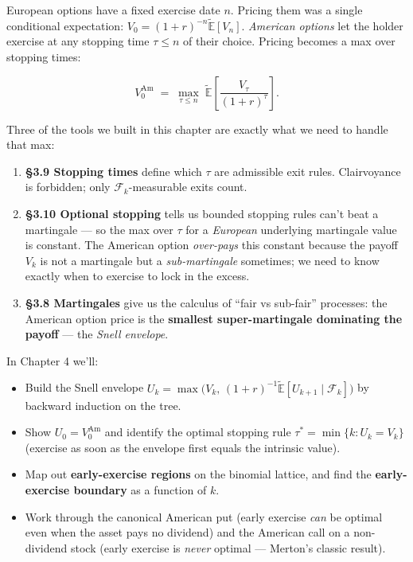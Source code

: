 \documentclass[
  10pt,
  twoside]{book}
\providecommand{\tightlist}{%
  \setlength{\itemsep}{0pt}\setlength{\parskip}{0pt}}
\begin{document}
European options have a fixed exercise date \(n\). Pricing them was a
single conditional expectation:
\(V_0 = (1+r)^{-n}\tilde{\mathbb E}[V_n]\). \emph{American options} let
the holder exercise at any stopping time \(\tau \le n\) of their choice.
Pricing becomes a max over stopping times:

\[V_0^{\mathrm{Am}} \;=\; \max_{\tau \le n}\; \tilde{\mathbb E}\!\left[\frac{V_\tau}{(1+r)^\tau}\right].\]

Three of the tools we built in this chapter are exactly what we need to
handle that max:

\begin{enumerate}
\def\labelenumi{\arabic{enumi}.}
\tightlist
\item
  \textbf{§3.9 Stopping times} define which \(\tau\) are admissible exit
  rules. Clairvoyance is forbidden; only \(\mathcal F_k\)-measurable
  exits count.
\item
  \textbf{§3.10 Optional stopping} tells us bounded stopping rules can't
  beat a martingale --- so the max over \(\tau\) for a \emph{European}
  underlying martingale value is constant. The American option
  \emph{over-pays} this constant because the payoff \(V_k\) is not a
  martingale but a \emph{sub-martingale} sometimes; we need to know
  exactly when to exercise to lock in the excess.
\item
  \textbf{§3.8 Martingales} give us the calculus of ``fair vs sub-fair''
  processes: the American option price is the \textbf{smallest
  super-martingale dominating the payoff} --- the \emph{Snell envelope}.
\end{enumerate}

In Chapter 4 we'll:

\begin{itemize}
\tightlist
\item
  Build the Snell envelope
  \(U_k = \max\!\bigl(V_k,\, (1+r)^{-1}\tilde{\mathbb E}[U_{k+1} \mid \mathcal F_k]\bigr)\)
  by backward induction on the tree.
\item
  Show \(U_0 = V_0^{\mathrm{Am}}\) and identify the optimal stopping
  rule \(\tau^* = \min\{k : U_k = V_k\}\) (exercise as soon as the
  envelope first equals the intrinsic value).
\item
  Map out \textbf{early-exercise regions} on the binomial lattice, and
  find the \textbf{early-exercise boundary} as a function of \(k\).
\item
  Work through the canonical American put (early exercise \emph{can} be
  optimal even when the asset pays no dividend) and the American call on
  a non-dividend stock (early exercise is \emph{never} optimal ---
  Merton's classic result).
\end{itemize}
\end{document}
